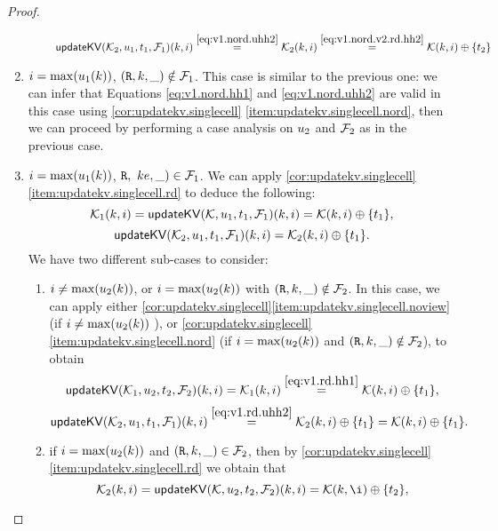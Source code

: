 \begin{proof}
\begin{enumerate}
\begin{enumerate}
\[\begin{array}{l}
\mathsf{updateKV}(\mathcal{K}_2,u_1, t_1,\mathcal{F}_1)(k, i) \stackrel{\eqref{eq:v1.nord.uhh2}}{=} \mathcal{K}_2(k, i) \stackrel{\eqref{eq:v1.nord.v2.rd.hh2}} = \mathcal{K}(k, i) \oplus \{t_2\}
\end{array}
\]
\end{enumerate}
\item $i = \max(u_1(k))$, $(\texttt{R}, k, \_) \notin \mathcal{F}_1$. This case is similar to the previous one: we can infer 
that Equations \eqref{eq:v1.nord.hh1} and \eqref{eq:v1.nord.uhh2} are valid in this case using \cref{cor:updatekv.singlecell}
\eqref{item:updatekv.singlecell.nord}, then we can proceed by performing a case analysis on $u_2$ and $\mathcal{F}_2$ as in the previous case.
\item $i = \max(u_1(k))$, $\texttt{R},\ ke, \_) \in \mathcal{F}_1$. We can apply \cref{cor:updatekv.singlecell}\eqref{item:updatekv.singlecell.rd} 
to deduce the following: 
\begin{equation}
\mathcal{K}_1(k, i) = \mathsf{updateKV}(\mathcal{K}, u_1, t_1, \mathcal{F}_1)(k, i) = \mathcal{K}(k, i) \oplus \{t_1\},
\label{eq:v1.rd.hh1}
\end{equation}
\begin{equation}
\mathsf{updateKV}(\mathcal{K}_2, u_1, t_1, \mathcal{F}_1)(k, i) = \mathcal{K}_2(k, i) \oplus \{t_1\}. 
\label{eq:v1.rd.uhh2}
\end{equation}
We have two different sub-cases to consider: 
\begin{enumerate}
\item $i \neq \max(u_2(k))$, or $i = \max(u_2(k))$ with $(\texttt{R},k,\_) \notin \mathcal{F}_2$. In this case, we can apply either 
\cref{cor:updatekv.singlecell}\eqref{item:updatekv.singlecell.noview} (if $i \neq \max(u_2(k))$ ), or 
\cref{cor:updatekv.singlecell} \eqref{item:updatekv.singlecell.nord} (if $i = \max(u_2(k))$ and $(\texttt{R}, k, \_) \notin \mathcal{F}_2$), 
to obtain 
\[
\mathsf{updateKV}(\mathcal{K}_1, u_2, t_2, \mathcal{F}_2)(k, i) = \mathcal{K}_1(k, i) \stackrel{\eqref{eq:v1.rd.hh1}}{=} \mathcal{K}(k, i) \oplus \{t_1\},
\]
\[
\mathsf{updateKV}(\mathcal{K}_2, u_1, t_1, \mathcal{F}_1)(k, i) \stackrel{\eqref{eq:v1.rd.uhh2}}{=} \mathcal{K}_2(k, i) \oplus \{ t_1 \} = 
\mathcal{K}(k, i) \oplus \{ t_1 \}.
\]
\item if $i = \max(u_2(k))$ and $(\texttt{R}, k, \_) \in \mathcal{F}_2$, then by \cref{cor:updatekv.singlecell}\eqref{item:updatekv.singlecell.rd} 
we obtain that 
\begin{equation}
\hh_2(\ke, i) = \updateKV(\hh, \vi_2, \txid_2, \opset_2)(\ke, i) = \hh(\ke, \i) \oplus \{\txid_2\},
\label{eq:v1.rd.v2.rd.hh2}
\end{equation}

\end{enumerate}
\end{enumerate}
\end{proof}
